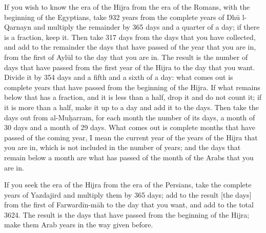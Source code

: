 \documentclass[11pt]{article}
\begin{document}
\par If you wish to know the era of the Hijra from the era of the Romans, with the beginning of the Egyptians, take 932 years from the complete years of Dhū l-Qarnayn and multiply the remainder by 365 days and a quarter of a day; if there is a fraction, keep it. Then take 317 days from the days that you have collected, and add to the remainder the days that have passed of the year that you are in, from the first of Aylūl to the day that you are in. The result is the number of days that have passed from the first year of the Hijra to the day that you want. Divide it by 354 days and a fifth and a sixth of a day: what comes out is complete years that have passed from the beginning of the Hijra. If what remains below that has a fraction, and it is less than a half, drop it and do not count it; if it is more than a half, make it up to a day and add it to the days. Then take the days out from al-Muḥarram, for each month the number of its days, a month of 30 days and a month of 29 days. What comes out is complete months that have passed of the coming year, I mean the current year of the years of the Hijra that you are in, which is not included in the number of years; and the days that remain below a month are what has passed of the month of the Arabs that you are in.\par
\par If you seek the era of the Hijra from the era of the Persians, take the complete years of Yazdajird and multiply them by 365 days; add to the result [the days] from the first of Farwardīn-māh to the day that you want, and add to the total 3624. The result is the days that have passed from the beginning of the Hijra; make them Arab years in the way given before.\par
\end{document}
